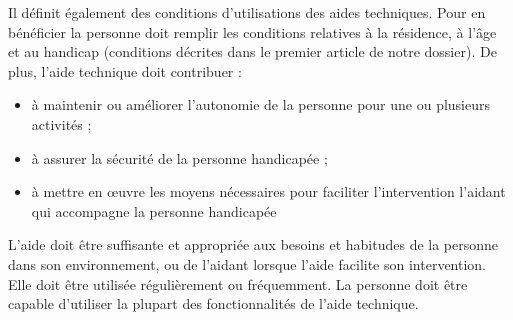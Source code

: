 Il définit également des conditions d'utilisations des aides techniques.
Pour en bénéficier la personne doit remplir les conditions relatives à la résidence, à l'âge et au handicap (conditions décrites dans le premier article de notre dossier). De plus, l'aide technique doit contribuer : 
\begin{itemize}
\item à maintenir ou améliorer l'autonomie de la personne pour une ou plusieurs activités ;
\item à assurer la sécurité de la personne handicapée ;
\item à mettre en œuvre les moyens nécessaires pour faciliter l'intervention l'aidant qui accompagne la personne handicapée
\end{itemize}

L'aide doit être suffisante et appropriée aux besoins et habitudes de la personne dans son environnement, ou de l'aidant lorsque l'aide facilite son intervention. Elle doit être utilisée régulièrement ou fréquemment. La personne doit être capable d'utiliser la plupart des fonctionnalités de l'aide technique.